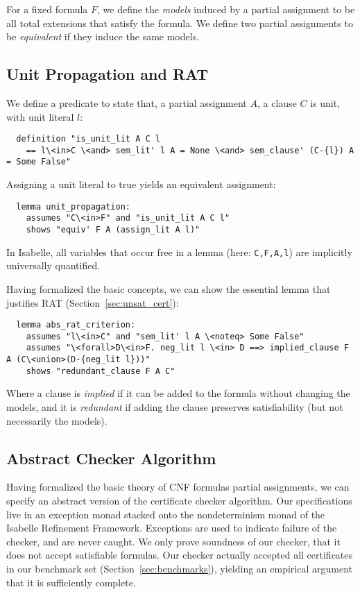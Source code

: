 \documentclass{llncs}
\newcommand{\isai}{\lstinline[language=isabelle,basicstyle=\normalsize\ttfamily\slshape]}
\begin{document}
For a fixed formula $F$, we define the \emph{models} induced by a partial assignment to be all total extensions that satisfy the formula. 
We define two partial assignments to be \emph{equivalent} if they induce the same models.

\subsection{Unit Propagation and RAT}
We define a predicate to state that, \wrt a partial assignment $A$, a clause $C$ is unit, with unit literal $l$:
\begin{lstlisting}
  definition "is_unit_lit A C l 
    == l\<in>C \<and> sem_lit' l A = None \<and> sem_clause' (C-{l}) A = Some False"
\end{lstlisting}
Assigning a unit literal to true yields an equivalent assignment:
\begin{lstlisting}
  lemma unit_propagation:
    assumes "C\<in>F" and "is_unit_lit A C l"
    shows "equiv' F A (assign_lit A l)"
\end{lstlisting}
In Isabelle, all variables that occur free in a lemma (here: \isai{C,F,A,l}) are implicitly universally quantified.

Having formalized the basic concepts, we can show the essential lemma that justifies RAT (\cf Section~\ref{sec:unsat_cert}):
\begin{lstlisting}
  lemma abs_rat_criterion:
    assumes "l\<in>C" and "sem_lit' l A \<noteq> Some False"
    assumes "\<forall>D\<in>F. neg_lit l \<in> D ==> implied_clause F A (C\<union>(D-{neg_lit l}))"  
    shows "redundant_clause F A C"
\end{lstlisting}
Where a clause is \emph{implied} if it can be added to the formula without changing the models, 
and it is \emph{redundant} if adding the clause preserves satisfiability (but not necessarily the models).


% 
% 
% 

\subsection{Abstract Checker Algorithm}
Having formalized the basic theory of CNF formulas \wrt partial assignments, we can specify an abstract version of the certificate checker algorithm.
Our specifications live in an exception monad stacked onto the nondeterminism monad of the Isabelle Refinement Framework.
Exceptions are used to indicate failure of the checker, and are never caught.
%
We only prove soundness of our checker, \ie that it does not accept satisfiable formulas.
Our checker actually accepted all certificates in our benchmark set (\cf Section~\ref{sec:benchmarks}), yielding 
an empirical argument that it is sufficiently complete.
\end{document}
